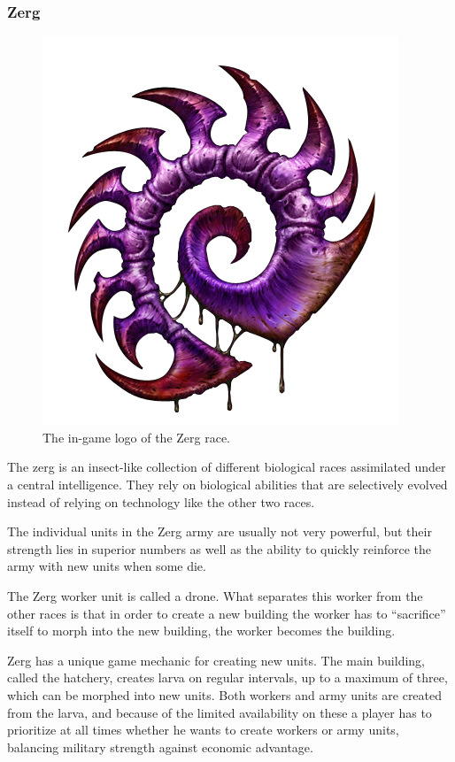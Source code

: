 \subsubsection{Zerg}
\begin{figure}[h!tb]
\centering
\includegraphics[scale=0.2]{graphics/zergicon.png}
\caption{The in-game logo of the Zerg race.\cite{zerglogo}}
\end{figure}

The zerg is an insect-like collection of different biological races assimilated under a central intelligence.
They rely on biological abilities that are selectively evolved instead of relying on technology like the other two races.

The individual units in the Zerg army are usually not very powerful, but their strength lies in superior numbers as well as the ability to quickly reinforce the army with new units when some die.

The Zerg worker unit is called a drone. What separates this worker from the other races is that in order to create a new building the worker has to ``sacrifice'' itself to morph into the new building, the worker becomes the building.

Zerg has a unique game mechanic for creating new units. The main building, called the hatchery, creates larva on regular intervals, up to a maximum of three, which can be morphed into new units. Both workers and army units are created from the larva, and because of the limited availability on these a player has to prioritize at all times whether he wants to create workers or army units, balancing military strength against economic advantage.

